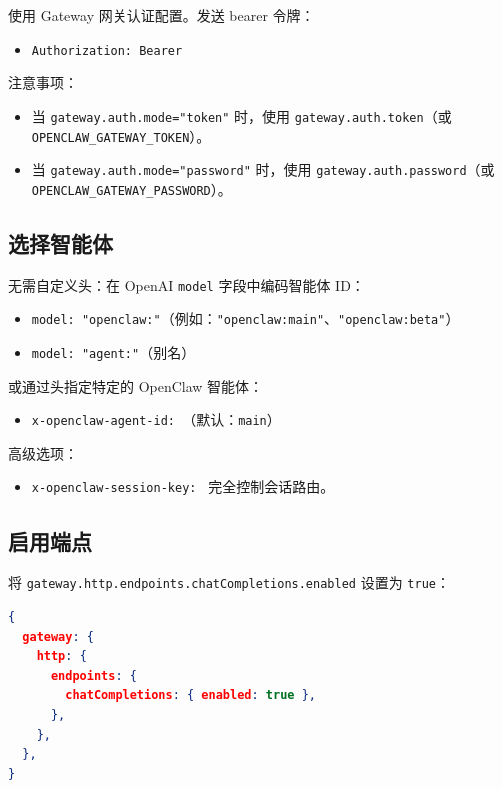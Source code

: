 使用 Gateway 网关认证配置。发送 bearer 令牌：

\begin{itemize}
  \item \texttt{Authorization: Bearer }
\end{itemize}


注意事项：

\begin{itemize}
  \item 当 \texttt{gateway.auth.mode="token"} 时，使用 \texttt{gateway.auth.token}（或 \texttt{OPENCLAW\_GATEWAY\_TOKEN}）。
  \item 当 \texttt{gateway.auth.mode="password"} 时，使用 \texttt{gateway.auth.password}（或 \texttt{OPENCLAW\_GATEWAY\_PASSWORD}）。
\end{itemize}


\subsection{选择智能体}


无需自定义头：在 OpenAI \texttt{model} 字段中编码智能体 ID：

\begin{itemize}
  \item \texttt{model: "openclaw:"}（例如：\texttt{"openclaw:main"}、\texttt{"openclaw:beta"}）
  \item \texttt{model: "agent:"}（别名）
\end{itemize}


或通过头指定特定的 OpenClaw 智能体：

\begin{itemize}
  \item \texttt{x-openclaw-agent-id: }（默认：\texttt{main}）
\end{itemize}


高级选项：

\begin{itemize}
  \item \texttt{x-openclaw-session-key: } 完全控制会话路由。
\end{itemize}


\subsection{启用端点}


将 \texttt{gateway.http.endpoints.chatCompletions.enabled} 设置为 \texttt{true}：

\begin{lstlisting}[language=json]
{
  gateway: {
    http: {
      endpoints: {
        chatCompletions: { enabled: true },
      },
    },
  },
}
\end{lstlisting}


